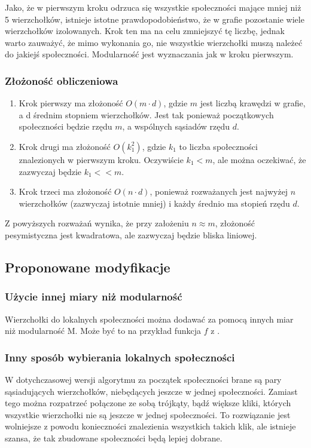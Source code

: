 \documentclass{article}
\begin{document}
Jako, że w pierwszym kroku odrzuca się wszystkie społeczności mające mniej niż 5 wierzchołków, istnieje istotne prawdopodobieństwo, że w grafie pozostanie wiele wierzchołków izolowanych. Krok ten ma na celu zmniejszyć tę liczbę, jednak warto zauważyć, że mimo wykonania go, nie wszystkie wierzchołki muszą należeć do jakiejś społeczności. Modularność jest wyznaczania jak w kroku pierwszym.

\subsubsection{Złożoność obliczeniowa}
\begin{enumerate}
\item Krok pierwszy ma złożoność $O(m\cdot d)$, gdzie $m$ jest liczbą krawędzi w grafie, a d średnim stopniem wierzchołków. Jest tak ponieważ początkowych społeczności będzie rzędu $m$, a wspólnych sąsiadów rzędu $d$.
\item Krok drugi ma złożoność $O(k_1^2)$, gdzie $k_1$ to liczba społeczności znalezionych w pierwszym kroku. Oczywiście $k_1 < m$, ale można oczekiwać, że zazwyczaj będzie $k_1 << m$.
\item Krok trzeci ma złożoność $O(n\cdot d)$, ponieważ rozważanych jest najwyżej $n$ wierzchołków (zazwyczaj istotnie mniej) i każdy średnio ma stopień rzędu $d$.
\end{enumerate}
Z powyższych rozważań wynika, że przy założeniu $n \approx m$, złożoność pesymistyczna jest kwadratowa, ale zazwyczaj będzie bliska liniowej.

\subsection{Proponowane modyfikacje}
\subsubsection{Użycie innej miary niż modularność}
Wierzchołki do lokalnych społeczności można dodawać za pomocą innych miar niż modularność M. Może być to na przykład funkcja $f$ z \cite{bt-paper2}.
\subsubsection{Inny sposób wybierania lokalnych społeczności}
W dotychczasowej wersji algorytmu za początek społeczności brane są pary sąsiadujących wierzchołków, niebędących jeszcze w jednej społeczności. Zamiast tego można rozpatrzeć połączone ze sobą trójkąty, bądź większe kliki, których wszystkie wierzchołki nie są jeszcze w jednej społeczności. To rozwiązanie jest wolniejsze z powodu konieczności znalezienia wszystkich takich klik, ale istnieje szansa, że tak zbudowane społeczności będą lepiej dobrane. 
\end{document}
